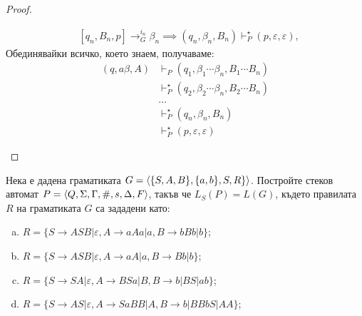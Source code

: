 \begin{proof}
\begin{enumerate}[1)]
\begin{description}
\begin{align*}
        & [q_n,B_n,p] \rightarrow^{i_n}_G \beta_n \implies (q_n,\beta_n,B_n) \vdash^\star_P (p,\varepsilon,\varepsilon),
      \end{align*}
      Обединявайки всичко, което знаем, получаваме:
      \begin{align*}
        (q, a\beta, A) & \vdash_P (q_1, \beta_1\cdots\beta_n, B_1\cdots B_n)\\
        & \vdash^\star_P (q_2, \beta_{2}\cdots\beta_n, B_2\cdots B_n)\\
        & \dots\\
        & \vdash^\star_P (q_n, \beta_n, B_n)\\
        & \vdash^\star_P (p, \varepsilon, \varepsilon)
      \end{align*}
    \end{description}
  \end{enumerate}
\end{proof}

\begin{problem}
  Нека е дадена граматиката $G = \langle{\{S,A,B\},\{a,b\},S,R\}}\rangle$.
  Постройте стеков автомат $P = \langle{Q,\Sigma,\Gamma,\#,s,\Delta,F}\rangle$, такъв че $L_S(P) = L(G)$, където правилата $R$ на граматиката $G$ са зададени като:
  \begin{enumerate}[a)]
  \item
    $R = \{S\rightarrow ASB\vert \varepsilon, A\rightarrow aAa\vert a, B\rightarrow bBb\vert b\}$;
  \item
    $R = \{S\rightarrow ASB\vert \varepsilon, A\rightarrow aA\vert a, B\rightarrow Bb\vert b\}$;
  \item
    $R =\{S\rightarrow SA|\varepsilon,A\rightarrow BSa|B, B\rightarrow b|BS|ab\}$;
  \item
    $R = \{S\rightarrow AS|\varepsilon,A\rightarrow SaBB|A, B\rightarrow b|BBbS|AA\}$;
  \end{enumerate}
\end{problem}

